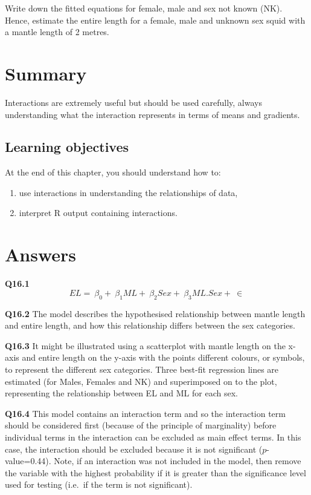 \documentclass[
  oneside]{krantz}
\providecommand{\tightlist}{%
  \setlength{\itemsep}{0pt}\setlength{\parskip}{0pt}}
\begin{document}
Write down the fitted equations for female, male and sex not known (NK).
Hence, estimate the entire length for a female, male and unknown sex squid with a mantle length of 2 metres.

\hypertarget{SUMinterac}{%
\section{Summary}\label{SUMinterac}}

Interactions are extremely useful but should be used carefully, always understanding what the interaction represents in terms of means and gradients.

\hypertarget{learning-objectives-4}{%
\subsection{Learning objectives}\label{learning-objectives-4}}

At the end of this chapter, you should understand how to:

\begin{enumerate}
\def\labelenumi{\arabic{enumi}.}
\tightlist
\item
  use interactions in understanding the relationships of data,
\item
  interpret R output containing interactions.
\end{enumerate}

\hypertarget{ANSinterac}{%
\section{Answers}\label{ANSinterac}}

\textbf{Q16.1}
\[
EL=\ {\beta{}}_0+\ {\beta{}}_1ML+\ {\beta{}}_2Sex+\ {\beta{}}_3ML.Sex+\ \in{}
\]

\textbf{Q16.2} The model describes the hypothesised relationship between mantle length and entire length, and how this relationship differs between the sex categories.

\textbf{Q16.3} It might be illustrated using a scatterplot with mantle length on the x-axis and entire length on the y-axis with the points different colours, or symbols, to represent the different sex categories. Three best-fit regression lines are estimated (for Males, Females and NK) and superimposed on to the plot, representing the relationship between EL and ML for each sex.

\textbf{Q16.4} This model contains an interaction term and so the interaction term should be considered first (because of the principle of marginality) before individual terms in the interaction can be excluded as main effect terms. In this case, the interaction should be excluded because it is not significant (\(p\)-value=0.44). Note, if an interaction was not included in the model, then remove the variable with the highest probability if it is greater than the significance level used for testing (i.e.~if the term is not significant).
\end{document}
